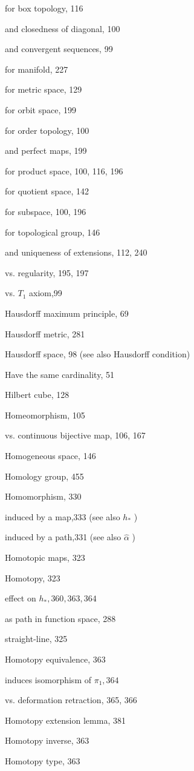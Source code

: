 for box topology, 116

and closedness of diagonal, 100

and convergent sequences, 99

for manifold, 227

for metric space, 129

for orbit space, 199

for order topology, 100

and perfect maps, 199

for product space, 100, 116, 196

for quotient space, 142

for subspace, 100, 196

for topological group, 146

and uniqueness of extensions, 112, 240

vs. regularity, 195, 197

vs. \({T}_{1}\) axiom,99

Hausdorff maximum principle, 69

Hausdorff metric, 281

Hausdorff space, 98 (see also Hausdorff condition)

Have the same cardinality, 51

Hilbert cube, 128

Homeomorphism, 105

vs. continuous bijective map, 106, 167

Homogeneous space, 146

Homology group, 455

Homomorphism, 330

induced by a map,333 (see also \({h}_{ * }\) )

induced by a path,331 (see also \(\widehat{\alpha }\) )

Homotopic maps, 323

Homotopy, 323

effect on \({h}_{ * },{360},{363},{364}\)

as path in function space, 288

straight-line, 325

Homotopy equivalence, 363

induces isomorphism of \({\pi }_{1},{364}\)

vs. deformation retraction, 365, 366

Homotopy extension lemma, 381

Homotopy inverse, 363

Homotopy type, 363


